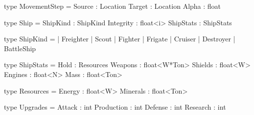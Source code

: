 type MovementStep = {
  Source      : Location
  Target      : Location
  Alpha       : float
}


type Ship = {
  ShipKind    : ShipKind
  Integrity   : float<i>
  ShipStats   : ShipStats
}


type ShipKind = 
  | Freighter
  | Scout
  | Fighter
  | Frigate
  | Cruiser
  | Destroyer
  | BattleShip


type ShipStats = {
  Hold          : Resources
  Weapons       : float<W*Ton>
  Shields       : float<W>
  Engines       : float<N>
  Mass          : float<Ton>
}


type Resources = {
  Energy        : float<W>
  Minerals      : float<Ton>
}


type Upgrades = {
  Attack        : int
  Production    : int
  Defense       : int
  Research      : int
}



